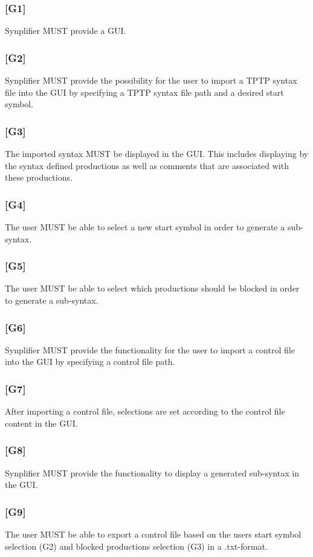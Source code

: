 \subsubsection{[G1]}\label{G1}
\ac{Synplifier} MUST provide a GUI.
\subsubsection{[G2]}\label{G2}
\ac{Synplifier} MUST provide the possibility for the user to import a \ac{TPTP} syntax file into the GUI by specifying a \ac{TPTP} syntax file path and a desired start symbol. 
\subsubsection{[G3]}\label{G3}
The imported syntax MUST be displayed in the GUI. This includes displaying by the syntax defined productions as well as comments that are associated with these productions.
\subsubsection{[G4]}\label{G4}
The user MUST be able to select a new start symbol in order to generate a sub-syntax.
\subsubsection{[G5]}\label{G5}
The user MUST be able to select which productions should be blocked in order to generate a sub-syntax.
\subsubsection{[G6]}\label{G9}
\ac{Synplifier} MUST provide the functionality for the user to import a control file into the GUI by specifying a control file path. 
\subsubsection{[G7]}\label{G7}
After importing a control file, selections are set according to the control file content in the GUI.
\subsubsection{[G8]}\label{G8}
\ac{Synplifier} MUST provide the functionality to display a generated sub-syntax in the GUI.
\subsubsection{[G9]}\label{G9}
The user MUST be able to export a control file based on the users start symbol selection (G2) and blocked productions selection (G3) in a .txt-format.
